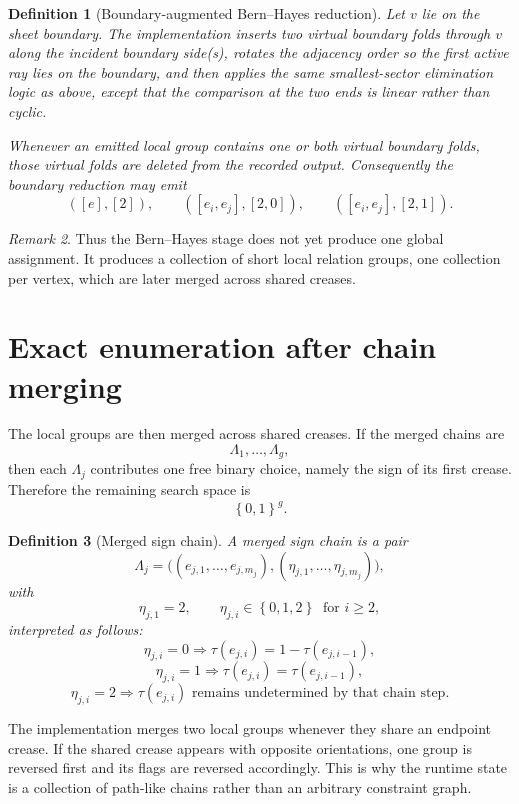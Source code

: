 \documentclass[11pt]{article}
\newtheorem{definition}{Definition}[section]
\theoremstyle{remark}
\newtheorem{remark}[definition]{Remark}
\newcommand{\set}[1]{\left\{ #1 \right\}}
\begin{document}
\begin{definition}[Boundary-augmented Bern--Hayes reduction]
Let $v$ lie on the sheet boundary. The implementation inserts two virtual
boundary folds through $v$ along the incident boundary side(s), rotates the
adjacency order so the first active ray lies on the boundary, and then applies
the same smallest-sector elimination logic as above, except that the comparison
at the two ends is linear rather than cyclic.

Whenever an emitted local group contains one or both virtual boundary folds,
those virtual folds are deleted from the recorded output. Consequently the
boundary reduction may emit
\[
([e],[2]),
\qquad
([e_i,e_j],[2,0]),
\qquad
([e_i,e_j],[2,1]).
\]
\end{definition}

\begin{remark}
Thus the Bern--Hayes stage does not yet produce one global assignment. It
produces a collection of short local relation groups, one collection per
vertex, which are later merged across shared creases.
\end{remark}

\section{Exact enumeration after chain merging}

The local groups are then merged across shared creases. If the merged chains are
\[
\Lambda_1,\dots,\Lambda_g,
\]
then each $\Lambda_j$ contributes one free binary choice, namely the sign of
its first crease. Therefore the remaining search space is
\[
\set{0,1}^g.
\]

\begin{definition}[Merged sign chain]
A merged sign chain is a pair
\[
\Lambda_j=\bigl((e_{j,1},\dots,e_{j,m_j}),(\eta_{j,1},\dots,\eta_{j,m_j})\bigr),
\]
with
\[
\eta_{j,1}=2,
\qquad
\eta_{j,i}\in\set{0,1,2}\ \text{ for }i\ge2,
\]
interpreted as follows:
\[
\eta_{j,i}=0
\Longrightarrow
\tau(e_{j,i})=1-\tau(e_{j,i-1}),
\]
\[
\eta_{j,i}=1
\Longrightarrow
\tau(e_{j,i})=\tau(e_{j,i-1}),
\]
\[
\eta_{j,i}=2
\Longrightarrow
\tau(e_{j,i})\text{ remains undetermined by that chain step.}
\]
\end{definition}

The implementation merges two local groups whenever they share an endpoint
crease. If the shared crease appears with opposite orientations, one group is
reversed first and its flags are reversed accordingly. This is why the runtime
state is a collection of path-like chains rather than an arbitrary constraint
graph.
\end{document}
